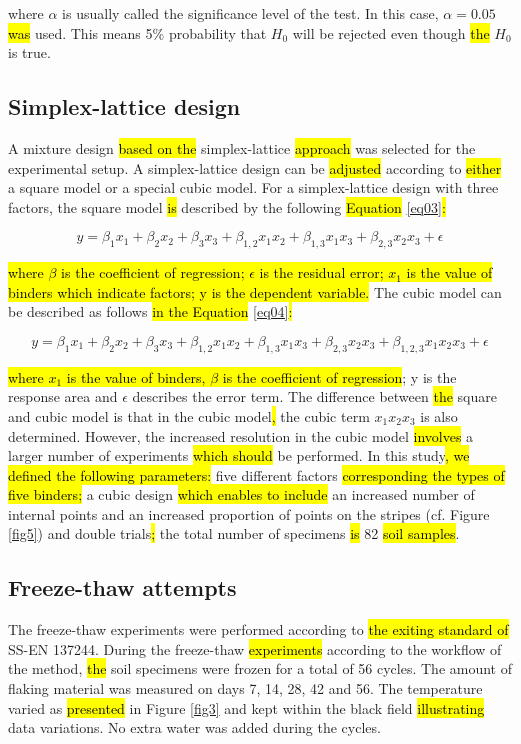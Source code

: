 \documentclass[constrmater,article,submit,pdftex,moreauthors]{Definitions/mdpi}
\begin{document}
where $\alpha$ is usually called the significance level of the test. In this case, $\alpha = 0.05 $ \hl{was} used. This means\hl{ }5\% probability that $H_0$ will be rejected even though \hl{the} $H_0$ is true. 

\subsection{Simplex-lattice design}
A mixture design \hl{based on the} simplex-lattice \hl{approach} was selected for the experimental setup. A simplex-lattice design can be \hl{adjusted} according to \hl{either} a square model or a special cubic model.  For a simplex-lattice design with three factors, the square model \hl{is} described by the following \hl{Equation} \ref{eq03}\hl{:}

\begin{equation}\label{eq03}
	y = \beta _1 x_1 +  \beta _2  x_2 +  \beta _3  x_3 + \beta _{1,2} x_1 x_2 + \beta _{1,3} x_1 x_3 + \beta _{2,3} x_2 x_3 + \epsilon
\end{equation}

\hl{where $\beta$ is the coefficient of regression; $\epsilon$ is the residual error; $x_1$ is the value of binders which indicate factors; y is the dependent variable.} The cubic model can be described as follows \hl{in the Equation} \ref{eq04}\hl{:}

\begin{equation}\label{eq04}
	y = \beta _1 x_1 + \beta _2 x_2 + \beta _3 x_3 + \beta _{1,2} x_1 x_2 + \beta _{1,3} x_1 x_3 + \beta _{2,3} x_2 x_3  + \beta _{1,2,3} x_1 x_2 x_3 + \epsilon
\end{equation}

\hl{where $x_1$ is the value of binders, $\beta$ is the coefficient of regression}; y is the response area and $\epsilon$ describes the error term.  The difference between \hl{the} square and cubic model is that in the cubic model\hl{, }the cubic term $x_1 x_2 x_3$ is also determined. However, the increased resolution in the cubic model \hl{involves} a larger number of experiments \hl{which should} be performed. In this study\hl{, we defined the following parameters:} five different factors \hl{corresponding the types of five binders;} a cubic design \hl{which enables to include} an increased number of internal points and an increased proportion of points on the stripes (cf. Figure \ref{fig5}) and double trials\hl{; }the total number of specimens \hl{is} 82 \hl{soil samples}.

\subsection{Freeze-thaw attempts}
The freeze-thaw experiments were performed according to \hl{the exiting standard of }SS-EN 137244. During the freeze-thaw \hl{experiments} according to the workflow of the method, \hl{the} soil specimens were frozen for a total of 56 cycles. The amount of flaking material was measured on days 7, 14, 28, 42 and 56. The temperature varied as \hl{presented} in Figure \ref{fig3} and kept within the black field \hl{illustrating} data variations. No extra water was added during the cycles.
\end{document}
